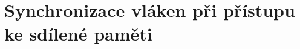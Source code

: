 \documentclass[usenames,dvipsnames,9pt]{beamer}
\begin{document}
  
    



\section{Synchronizace vláken při přístupu ke sdílené paměti}

  
%
%
%
\end{document}
